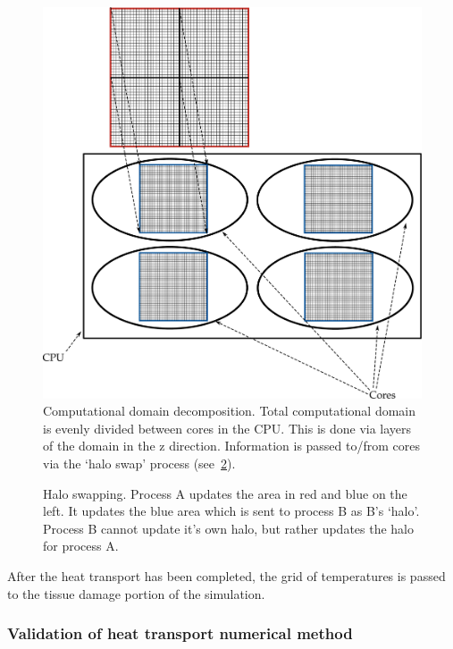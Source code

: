 \begin{figure}
\vspace{-45pt}
\centering
\includegraphics[scale=.35]{./ablation/images/grid-decomp.pdf}
\caption{Computational domain decomposition. Total computational domain is evenly divided between cores in the CPU. This is done via layers of the domain in the z direction. Information is passed to/from cores via the `halo swap' process (see~\cref{fig:haloswap}).}
\label{fig:griddecomp}
\vspace{-10pt}
\end{figure}

\begin{figure}
\centering
\def\svgwidth{350pt}

\caption{Halo swapping. Process A updates the area in red and blue on the left. It updates the blue area which is sent to process B as B's `halo'. Process B cannot update it's own halo, but rather updates the halo for process A.}
\label{fig:haloswap}
\end{figure}


After the heat transport has been completed, the grid of temperatures is passed to the tissue damage portion of the simulation.
\newpage
\subsubsection{Validation of heat transport numerical method}


